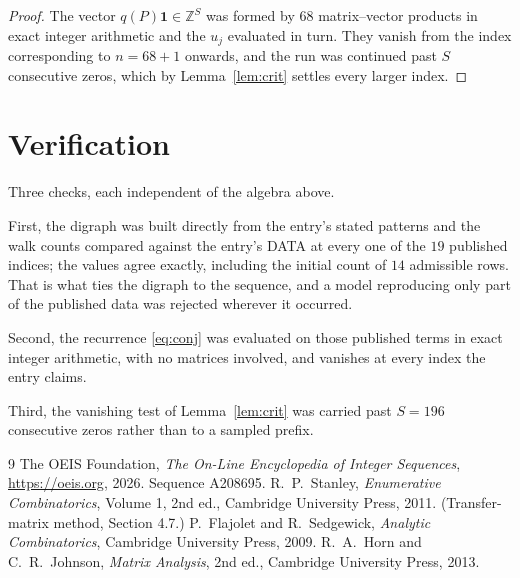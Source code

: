 \documentclass[11pt,a4paper]{article}
\theoremstyle{plain}
\theoremstyle{definition}
\begin{document}
\begin{proof}
The vector $q(P)\mathbf{1}\in\mathbb{Z}^{S}$ was formed by $68$ matrix--vector
products in exact integer arithmetic and the $u_j$ evaluated in turn. They vanish from the
index corresponding to $n=68+1$ onwards, and the run was continued past $S$ consecutive
zeros, which by Lemma~\ref{lem:crit} settles every larger index.
\end{proof}

\section{Verification}

Three checks, each independent of the algebra above.

First, the digraph was built directly from the entry's stated patterns and the walk counts
compared against the entry's DATA at every one of the $19$ published indices; the
values agree exactly, including the initial count of $14$ admissible rows. That is
what ties the digraph to the sequence, and a model reproducing only part of the published
data was rejected wherever it occurred.

Second, the recurrence \eqref{eq:conj} was evaluated on those published terms in exact
integer arithmetic, with no matrices involved, and vanishes at every index the entry claims.

Third, the vanishing test of Lemma~\ref{lem:crit} was carried past $S=196$ consecutive
zeros rather than to a sampled prefix.

\begin{thebibliography}{9}
 The OEIS Foundation, \emph{The On-Line Encyclopedia of Integer
Sequences}, \url{https://oeis.org}, 2026. Sequence A208695.
 R.~P.~Stanley, \emph{Enumerative Combinatorics}, Volume 1, 2nd ed.,
Cambridge University Press, 2011. (Transfer-matrix method, Section 4.7.)
 P.~Flajolet and R.~Sedgewick, \emph{Analytic Combinatorics}, Cambridge
University Press, 2009.
 R.~A.~Horn and C.~R.~Johnson, \emph{Matrix Analysis}, 2nd ed., Cambridge
University Press, 2013.
\end{thebibliography}
\end{document}
